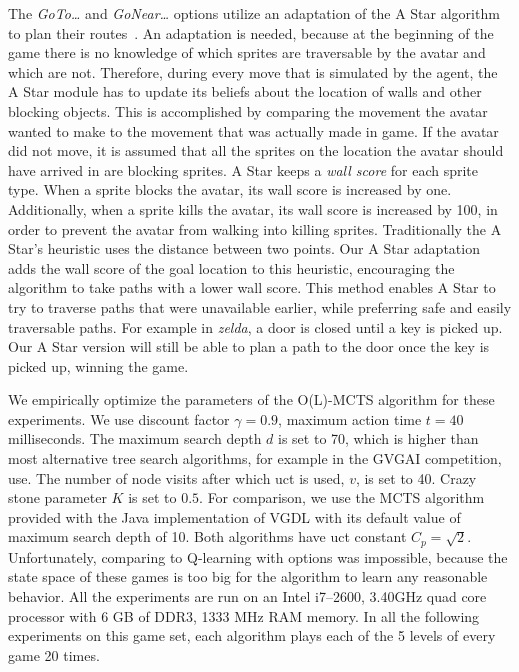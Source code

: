 The \emph{GoTo\ldots} and \emph{GoNear\ldots} options utilize an adaptation
of the A Star algorithm to plan their routes~\cite{hart1968formal}. An
adaptation is needed, because at the beginning of the game there is no knowledge
of which sprites are traversable by the avatar and which are not. Therefore,
during every move that is simulated by the agent, the A Star module has to
update its beliefs about the location of walls and other blocking objects. This
is accomplished by comparing the movement the avatar wanted to make to the
movement that was actually made in game. If the avatar did not move, it is
assumed that all the sprites on the location the avatar should have arrived in
are blocking sprites. A Star keeps a \emph{wall score} for each sprite type.
When a sprite blocks the avatar, its wall score is increased by one.
Additionally, when a sprite kills the avatar, its wall score is increased by
100, in order to prevent the avatar from walking into killing sprites.
Traditionally the A Star's heuristic uses the distance between two points. Our A
Star adaptation adds the wall score of the goal location to this heuristic,
encouraging the algorithm to take paths with a lower wall score. This method
enables A Star to try to traverse paths that were unavailable earlier, while
preferring safe and easily traversable paths. For example in \textit{zelda}, a
door is closed until a key is picked up. Our A Star version will still be able
to plan a path to the door once the key is picked up, winning the game.

We empirically optimize the parameters of the O(L)-MCTS algorithm
for these experiments. We use discount factor $\gamma = 0.9$, maximum action
time $t = 40$ milliseconds. The maximum search depth $d$ is set to 70, which is
higher than most alternative tree search algorithms, for example in the GVGAI
competition, use. The number of node visits after which \textsf{uct} is used,
$v$, is set to 40. Crazy stone parameter $K$ is set to $0.5$.  For comparison,
we use the MCTS algorithm provided with the Java implementation of VGDL with its
default value of maximum search depth of 10. Both algorithms have \textsf{uct}
constant $C_p = \sqrt{2}$. Unfortunately, comparing to Q-learning with options
was impossible, because the state space of these games is too big for the
algorithm to learn any reasonable behavior. All the experiments are run on an
Intel i7--2600, 3.40GHz quad core processor with 6 GB of DDR3, 1333 MHz RAM
memory. In all the following experiments on this game set, each algorithm plays
each of the 5 levels of every game 20 times. 

